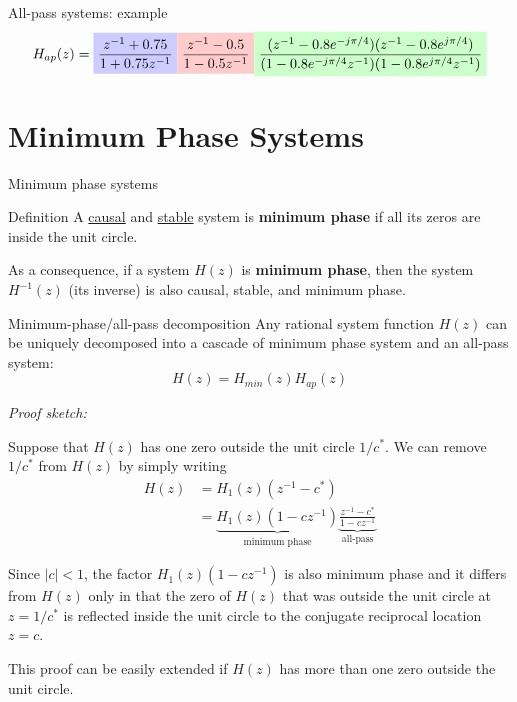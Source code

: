 \documentclass[10pt, handout]{beamer}
\begin{document}
%
\begin{frame}{All-pass systems: example}
\begin{equation*}
H_{ap}(z) = \tikz[baseline]{\node[fill=blue!20,anchor=base] {$\displaystyle\frac{z^{-1}+ 0.75}{1 + 0.75z^{-1}}$};}\tikz[baseline]{\node[fill=red!20,anchor=base] {$\displaystyle\frac{z^{-1} - 0.5}{1 -0.5z^{-1}}$};}\tikz[baseline]{\node[fill=green!20,anchor=base] {$\displaystyle\frac{(z^{-1} - 0.8e^{-j\pi/4})(z^{-1} - 0.8e^{j\pi/4})}{(1 - 0.8e^{-j\pi/4}z^{-1})(1 - 0.8e^{j\pi/4}z^{-1})}$};}
\end{equation*}

\begin{center}
	\resizebox{\linewidth}{!}{}
\end{center}
\end{frame}

\section{Minimum Phase Systems}
%
\begin{frame}{Minimum phase systems}
	\begin{block}{Definition}
		A \underline{causal} and \underline{stable} system is \textbf{minimum phase} if all its zeros are inside the unit circle.
	\end{block}

	As a consequence, if a system $H(z)$ is \textbf{minimum phase}, then the system $H^{-1}(z)$ (its inverse) is also causal, stable, and minimum phase.
	
\end{frame}

%
\begin{frame}{Minimum-phase/all-pass decomposition}
	Any rational system function $H(z)$ can be uniquely decomposed into a cascade of minimum phase system and an all-pass system:
	\begin{equation*}
	H(z) = H_{min}(z)H_{ap}(z)
	\end{equation*}
	
\textit{Proof sketch:}

Suppose that $H(z)$ has one zero outside the unit circle $1/c^*$. We can remove $1/c^*$ from $H(z)$ by simply writing
\begin{align*}
H(z) &= H_1(z)(z^{-1} - c^*) \\
&= \underbrace{H_1(z)(1 - cz^{-1})}_{\text{minimum phase}}\underbrace{\frac{z^{-1} - c^*}{1 - cz^{-1}}}_{\text{all-pass}}
\end{align*}

Since $|c| < 1$, the factor $H_1(z)(1 - cz^{-1})$ is also minimum phase and it differs from $H(z)$ only in that the zero of $H(z)$ that was outside the unit circle at $z = 1/c^*$ is reflected inside the unit circle to the conjugate reciprocal location $z = c$. 

This proof can be easily extended if $H(z)$ has more than one zero outside the unit circle.
	
\end{frame}
\end{document}
